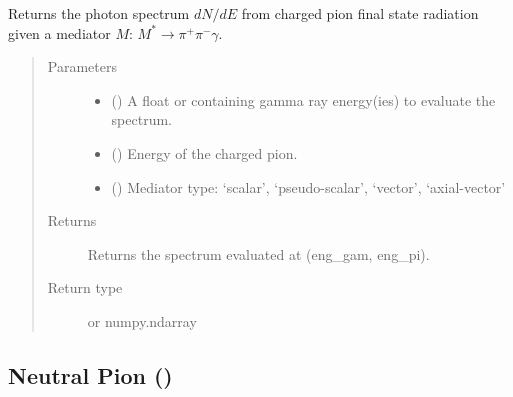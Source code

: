 \documentclass[letterpaper,10pt,english]{sphinxmanual}
\begin{document}
\begin{fulllineitems}
\label{\detokenize{Modules:charged_pion.fsr}}
Returns the photon spectrum \(dN/dE\) from charged pion final state radiation given a mediator \(M\): \(M^{*}\to\pi^{+}\pi^{-}\gamma\).
\begin{quote}\begin{description}
\item[{Parameters}] \leavevmode\begin{itemize}
\item {} 
 () \textendash{} A float or  containing gamma ray energy(ies) to evaluate the spectrum.

\item {} 
 () \textendash{} Energy of the charged pion.

\item {} 
 () \textendash{} Mediator type: ‘scalar’, ‘pseudo-scalar’, ‘vector’, ‘axial-vector’

\end{itemize}

\item[{Returns}] \leavevmode
Returns the spectrum evaluated at (eng\_gam, eng\_pi).

\item[{Return type}] \leavevmode
{} or numpy.ndarray

\end{description}\end{quote}

\end{fulllineitems}



\subsection{Neutral Pion ()}
\label{\detokenize{Modules:neutral-pion-hazma-particles-neutral-pion}}
\end{document}
